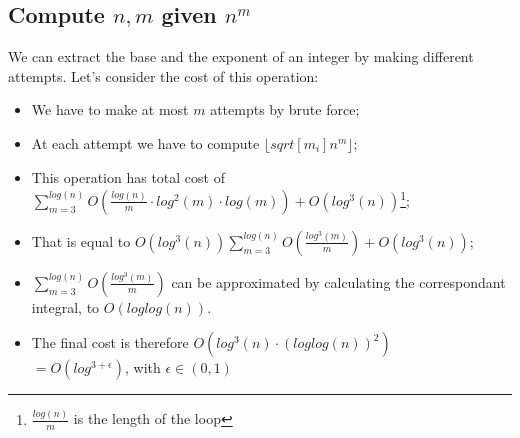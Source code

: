 \subsection{Compute $n, m$ given $n^{m}$}
We can extract the base and the exponent of an integer by making different attempts.\newline
Let's consider the cost of this operation:
\begin{itemize}
    \item We have to make at most $m$ attempts by brute force;
    \item At each attempt we have to compute $\lfloor sqrt[m_{i}]{n^{m}} \rfloor$;
    \item This operation has total cost of $\sum_{m=3}^{log(n)} O(\frac{log(n)}{m} \cdot log^{2}(m) \cdot log(m)) + O(log^{3}(n))$\footnote{$\frac{log(n)}{m}$ is the length of the loop};
    \item That is equal to $O(log^{3}(n)) \sum_{m=3}^{log(n)} O(\frac{log^{3}(m)}{m}) + O(log^{3}(n))$;
    \item $\sum_{m=3}^{log(n)} O(\frac{log^{3}(m)}{m})$ can be approximated by calculating the correspondant integral, to $O(loglog(n))$.
    \item The final cost is therefore $O(log^{3}(n) \cdot (loglog(n))^{2})$ \\
    $= O(log^{3 + \epsilon})$, with $\epsilon \in (0,1)$
\end{itemize}
